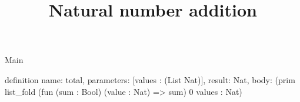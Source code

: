 \begin{lexlean}{Main}
\title{Natural number addition}
\begin{semanticmodule}
definition{
  name: total,
  parameters: [values : (List Nat)],
  result: Nat,
  body: (prim list_fold (fun (sum : Bool) (value : Nat) => sum) 0 values : Nat)
}
\end{semanticmodule}
\end{lexlean}
